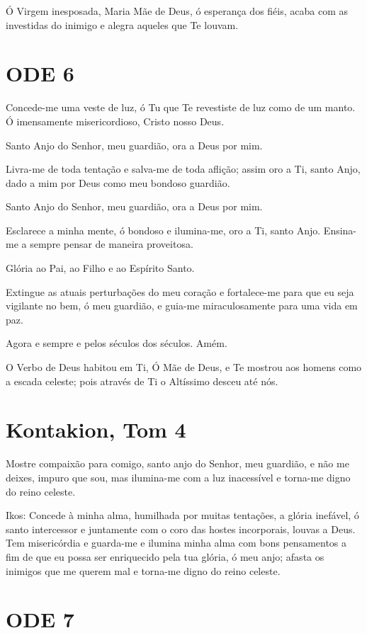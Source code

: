 \documentclass{subfiles}
\begin{document}
Ó Virgem inesposada, Maria Mãe de Deus, ó esperança dos fiéis, acaba
com as investidas do inimigo e alegra aqueles que Te louvam.

\section*{ODE 6}

\eirmos{}Concede-me uma veste de luz, ó Tu que Te revestiste de luz como de
um manto. Ó imensamente misericordioso, Cristo nosso Deus.

Santo Anjo do Senhor, meu guardião, ora a Deus por mim.

Livra-me de toda tentação e salva-me de toda aflição; assim oro a Ti,
santo Anjo, dado a mim por Deus como meu bondoso guardião.

Santo Anjo do Senhor, meu guardião, ora a Deus por mim.

Esclarece a minha mente, ó bondoso e ilumina-me, oro a Ti, santo
Anjo. Ensina-me a sempre pensar de maneira proveitosa.

Glória ao Pai, ao Filho e ao Espírito Santo.

Extingue as atuais perturbações do meu coração e fortalece-me para
que eu seja vigilante no bem, ó meu guardião, e guia-me miraculosamente
para uma vida em paz.

Agora e sempre e pelos séculos dos séculos. Amém.

O Verbo de Deus habitou em Ti, Ó Mãe de Deus, e Te mostrou aos
homens como a escada celeste; pois através de Ti o Altíssimo desceu até nós.

\section*{Kontakion, Tom 4}

Mostre compaixão para comigo, santo anjo do Senhor, meu
guardião, e não me deixes, impuro que sou, mas ilumina-me com a luz
inacessível e torna-me digno do reino celeste.

Ikos: Concede à minha alma, humilhada por muitas tentações, a glória inefável,
ó santo intercessor e juntamente com o coro das hostes incorporais, louvas a
Deus. Tem misericórdia e guarda-me e ilumina minha alma com bons
pensamentos a fim de que eu possa ser enriquecido pela tua glória, ó meu
anjo; afasta os inimigos que me querem mal e torna-me digno do reino celeste.

\section*{ODE 7}
\end{document}
